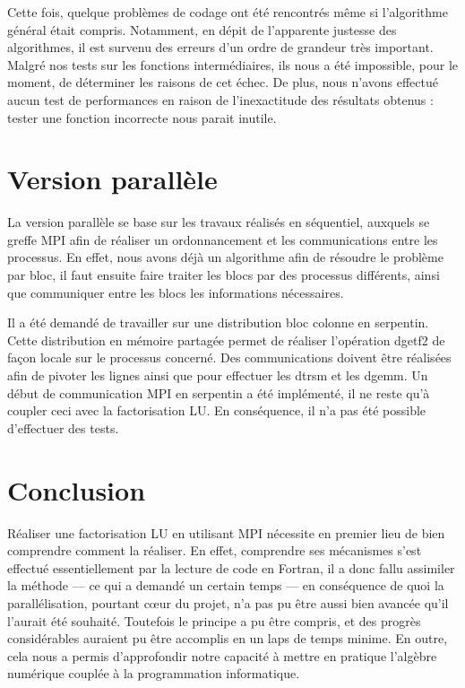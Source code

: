 \documentclass[a4paper,11pt]{article}
\begin{document}
Cette fois, quelque problèmes de codage ont été rencontrés même si l'algorithme général était compris. Notamment, en dépit de l'apparente justesse des algorithmes, il est survenu des erreurs d'un ordre de grandeur très important. Malgré nos tests sur les fonctions intermédiaires, ils nous a été impossible, pour le moment, de déterminer les raisons de cet échec. De plus, nous n'avons effectué aucun test de performances en raison de l'inexactitude des résultats obtenus : tester une fonction incorrecte nous parait inutile.

\section{Version parallèle}

La version parallèle se base sur les travaux réalisés en séquentiel, auxquels se greffe MPI afin de réaliser un ordonnancement et les communications entre les processus. En effet, nous avons déjà un algorithme afin de résoudre le problème par bloc, il faut ensuite faire traiter les blocs par des processus différents, ainsi que communiquer entre les blocs les informations nécessaires.

Il a été demandé de travailler sur une distribution bloc colonne en serpentin. Cette distribution en mémoire partagée permet de réaliser l'opération dgetf2 de façon locale sur le processus concerné. Des communications doivent être réalisées afin de pivoter les lignes ainsi que pour effectuer les dtrsm et les dgemm.  Un début de communication MPI en serpentin a été implémenté, il ne reste qu'à coupler ceci avec la factorisation LU. En conséquence, il n'a pas été possible d'effectuer des tests.

\section{Conclusion}

Réaliser une factorisation LU en utilisant MPI nécessite en premier lieu de bien comprendre comment la réaliser. En effet, comprendre ses mécanismes s'est effectué essentiellement par la lecture de code en Fortran, il a donc fallu assimiler la méthode --- ce qui a demandé un certain temps --- en conséquence de quoi la parallélisation, pourtant cœur du projet, n'a pas pu être aussi bien avancée qu'il l'aurait été souhaité. Toutefois le principe a pu être compris, et des progrès considérables auraient pu être accomplis en un laps de temps minime. En outre, cela nous a permis  d'approfondir notre capacité à mettre en pratique l'algèbre numérique couplée à la programmation informatique.
\end{document}
